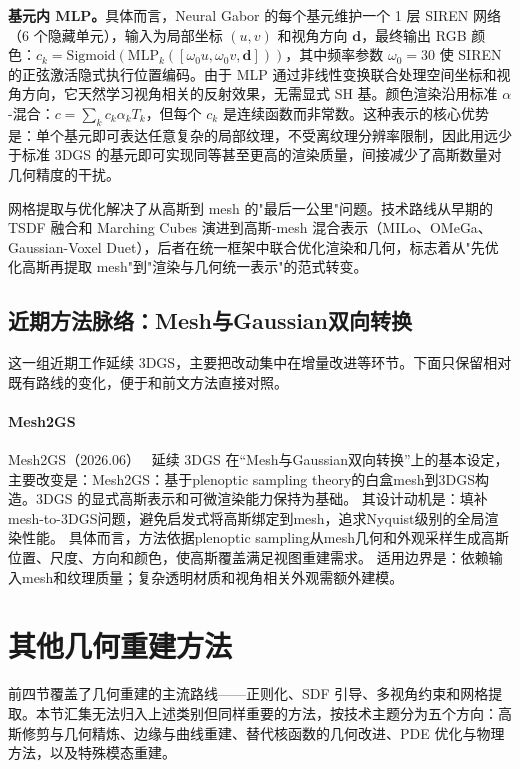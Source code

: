 \textbf{基元内 MLP。}具体而言，Neural Gabor 的每个基元维护一个 1 层 SIREN 网络（6 个隐藏单元），输入为局部坐标 $(u, v)$ 和视角方向 $\mathbf{d}$，最终输出 RGB 颜色：$c_k = \text{Sigmoid}(\text{MLP}_k([\omega_0 u, \omega_0 v, \mathbf{d}]))$，其中频率参数 $\omega_0 = 30$ 使 SIREN 的正弦激活隐式执行位置编码。由于 MLP 通过非线性变换联合处理空间坐标和视角方向，它天然学习视角相关的反射效果，无需显式 SH 基。颜色渲染沿用标准 $\alpha$-混合：$c = \sum_k c_k \alpha_k T_k$，但每个 $c_k$ 是连续函数而非常数。这种表示的核心优势是：单个基元即可表达任意复杂的局部纹理，不受离纹理分辨率限制，因此用远少于标准 3DGS 的基元即可实现同等甚至更高的渲染质量，间接减少了高斯数量对几何精度的干扰。

\begin{takeaway}
网格提取与优化解决了从高斯到 mesh 的"最后一公里"问题。技术路线从早期的 TSDF 融合和 Marching Cubes 演进到高斯-mesh 混合表示（MILo、OMeGa、Gaussian-Voxel Duet），后者在统一框架中联合优化渲染和几何，标志着从"先优化高斯再提取 mesh"到"渲染与几何统一表示"的范式转变。
\end{takeaway}


\subsection{近期方法脉络：Mesh与Gaussian双向转换}

这一组近期工作延续 3DGS，主要把改动集中在增量改进等环节。下面只保留相对既有路线的变化，便于和前文方法直接对照。

\paragraph{Mesh2GS}
Mesh2GS（2026.06）~\cite{2606_21898} 延续 3DGS 在“Mesh与Gaussian双向转换”上的基本设定，主要改变是：Mesh2GS：基于plenoptic sampling theory的白盒mesh到3DGS构造。3DGS 的显式高斯表示和可微渲染能力保持为基础。
其设计动机是：填补mesh-to-3DGS问题，避免启发式将高斯绑定到mesh，追求Nyquist级别的全局渲染性能。
具体而言，方法依据plenoptic sampling从mesh几何和外观采样生成高斯位置、尺度、方向和颜色，使高斯覆盖满足视图重建需求。
适用边界是：依赖输入mesh和纹理质量；复杂透明材质和视角相关外观需额外建模。
\section{其他几何重建方法}
\label{sec:04_5}

前四节覆盖了几何重建的主流路线——正则化、SDF 引导、多视角约束和网格提取。本节汇集无法归入上述类别但同样重要的方法，按技术主题分为五个方向：高斯修剪与几何精炼、边缘与曲线重建、替代核函数的几何改进、PDE 优化与物理方法，以及特殊模态重建。

